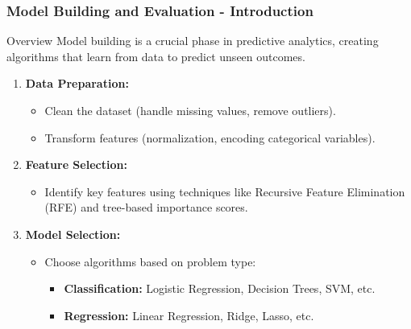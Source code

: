 \documentclass{beamer}
\begin{document}
\begin{frame}[fragile]
    \frametitle{Model Building and Evaluation - Introduction}
    \begin{block}{Overview}
        Model building is a crucial phase in predictive analytics, creating algorithms that learn from data to predict unseen outcomes.
    \end{block}

    \begin{enumerate}
        \item \textbf{Data Preparation:}
            \begin{itemize}
                \item Clean the dataset (handle missing values, remove outliers).
                \item Transform features (normalization, encoding categorical variables).
            \end{itemize}
        
        \item \textbf{Feature Selection:}
            \begin{itemize}
                \item Identify key features using techniques like Recursive Feature Elimination (RFE) and tree-based importance scores.
            \end{itemize}
        
        \item \textbf{Model Selection:}
            \begin{itemize}
                \item Choose algorithms based on problem type:
                    \begin{itemize}
                        \item \textbf{Classification:} Logistic Regression, Decision Trees, SVM, etc.
                        \item \textbf{Regression:} Linear Regression, Ridge, Lasso, etc.
                    \end{itemize}
            \end{itemize}
    \end{enumerate}
\end{frame}
\end{document}
